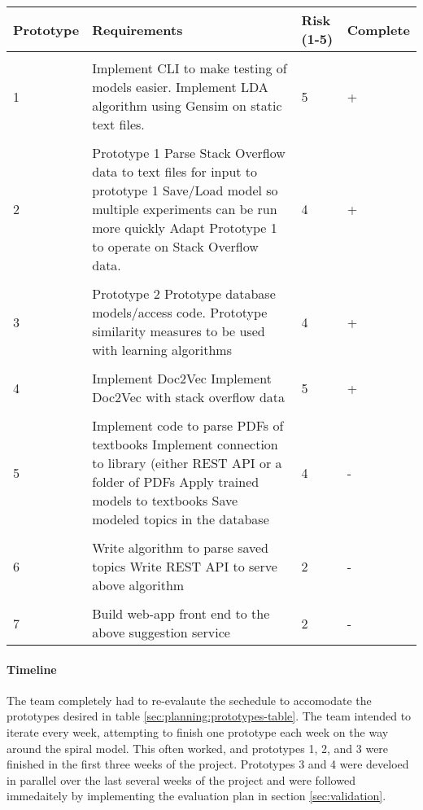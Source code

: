 \begin{table*}[t]
  \centering
  \caption{Prototypes and Schedules}
  \begin{tabular}{ l p{10cm} l l}
     \bf Prototype & \bf Requirements & \bf Risk (1-5) & \bf Complete \\ \hline \\
    1 & 
         Implement CLI to make testing of models easier. 
         \newline Implement LDA algorithm using Gensim on static text files.  
         & 5 & + \\ \\
    2 &
        Prototype 1
        Parse Stack Overflow data to text files for input to prototype 1
        Save/Load model so multiple experiments can be run more quickly
        Adapt Prototype 1 to operate on Stack Overflow data.
        & 4 & + \\ \\
    3 &
        Prototype 2
        Prototype database models/access code.
        Prototype similarity measures to be used with learning algorithms
        & 4 & + \\ \\
    4 &
        Implement Doc2Vec
        Implement Doc2Vec with stack overflow data
        & 5 & + \\ \\
    5 &
        Implement code to parse PDFs of textbooks
        Implement connection to library (either REST API or a folder of PDFs
        Apply trained models to textbooks
        Save modeled topics in the database
        & 4 & - \\ \\
    6 &
        Write algorithm to parse saved topics
        Write REST API to serve above algorithm
        & 2 & - \\ \\
    7 &
        Build web-app front end to the above suggestion service
        & 2 & - 
  \end{tabular} \label{sec:planning:prototypes-table}
\end{table*}

\paragraph{Timeline}
The team completely had to re-evalaute the sechedule to accomodate the
prototypes desired in table \ref{sec:planning:prototypes-table}.
The team intended to iterate every week, attempting to finish one
prototype each week on the way around the spiral model.
This often worked, and prototypes 1, 2, and 3 were finished in the
first three weeks of the project.
Prototypes 3 and 4 were develoed in parallel over the last several
weeks of the project and were followed immedaitely by implementing
the evaluation plan in section \ref{sec:validation}.

